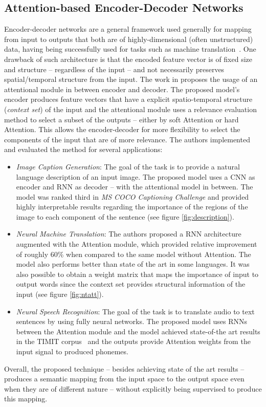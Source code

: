 \documentclass[English]{style/ic-tese-v3}
\begin{document}
\subsection{Attention-based Encoder-Decoder Networks}
Encoder-decoder networks are a general framework used generally for mapping from input to outputs that both
are of highly-dimensional (often unstructured) data, having being successfully used for tasks such
as machine translation~\cite{ref:enc-dec-rnns}.
One drawback of such architecture is that the encoded feature vector is of fixed size and structure --
regardless of the input -- and not necessarily preserves spatial/temporal structure from the input.
The work in \cite{ref:enc-dec} proposes the usage of an attentional module in between encoder and decoder.
The proposed model's encoder produces feature vectors that have a explicit spatio-temporal structure
(\emph{context set}) of the input and the attentional module uses a relevance evaluation
method to select a subset of the outputs -- either by soft Attention or hard Attention.
This allows the encoder-decoder for more flexibility to select the components of the input that are of
more relevance.
The authors implemented and evaluated the method for several applications:
\begin{itemize}
    \item \emph{Image Caption Generation}: The goal of the task is to provide a natural language description
        of an input image.
        The proposed model uses a CNN as encoder and RNN as decoder -- with the attentional model in between.
        The model was ranked third in \emph{MS COCO Captioning Challenge} and provided highly interpretable
        results regarding the importance of the regions of the image to each component of the sentence
        (see figure \ref{fig:description}).
    \item \emph{Neural Machine Translation}: The authors proposed a RNN architecture
        augmented with the Attention module,
        which provided relative improvement of roughly 60\% when compared to the same model without Attention.
        The model also performs better than state of the art in some languages.
        It was also possible to obtain a weight matrix that maps the importance of input to output words
        since the context set provides structural information of the input (see figure \ref{fig:ntatt}).
    \item \emph{Neural Speech Recognition}: The goal of the task is to translate audio to text sentences by
        using fully neural networks.
        The proposed model uses RNNs between the Attention module and the model achieved state-of-the art
        results in the TIMIT corpus~\cite{ref:timit} and the outputs provide Attention weights from
        the input signal to produced phonemes.
\end{itemize}
Overall, the proposed technique -- besides achieving state of the art results --
produces a semantic mapping from the input space to the output space even when they are of different nature
-- without explicitly being supervised to produce this mapping.
\end{document}
